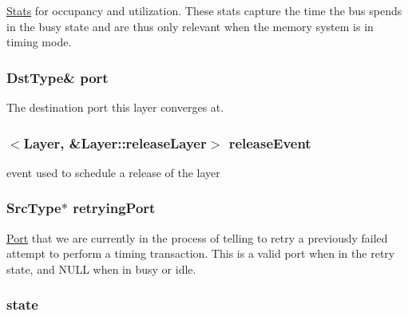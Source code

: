 \label{classBaseBus_1_1Layer_a4bdb9e419f12a845feff7f1c7923a75f}
\hyperlink{namespaceStats}{Stats} for occupancy and utilization. These stats capture the time the bus spends in the busy state and are thus only relevant when the memory system is in timing mode. \hypertarget{classBaseBus_1_1Layer_afb40502d9466732dadd57056e653d8f9}{
\subsubsection[{port}]{\setlength{\rightskip}{0pt plus 5cm}DstType\& {\bf port}}}
\label{classBaseBus_1_1Layer_afb40502d9466732dadd57056e653d8f9}
The destination port this layer converges at. \hypertarget{classBaseBus_1_1Layer_a69eab40ac3f909ccc29d20e8dbdc022e}{
\subsubsection[{releaseEvent}]{$<${\bf Layer}, \&Layer::releaseLayer$>$ {\bf releaseEvent}}}
\label{classBaseBus_1_1Layer_a69eab40ac3f909ccc29d20e8dbdc022e}
event used to schedule a release of the layer \hypertarget{classBaseBus_1_1Layer_a982a229cbb75d7774cb62aebcec3ee9f}{
\subsubsection[{retryingPort}]{\setlength{\rightskip}{0pt plus 5cm}SrcType$\ast$ {\bf retryingPort}}}
\label{classBaseBus_1_1Layer_a982a229cbb75d7774cb62aebcec3ee9f}
\hyperlink{classPort}{Port} that we are currently in the process of telling to retry a previously failed attempt to perform a timing transaction. This is a valid port when in the retry state, and NULL when in busy or idle. \hypertarget{classBaseBus_1_1Layer_a876b486d3a5241a126bd5751c5f70f79}{
\subsubsection[{state}]{ {\bf state}}}
